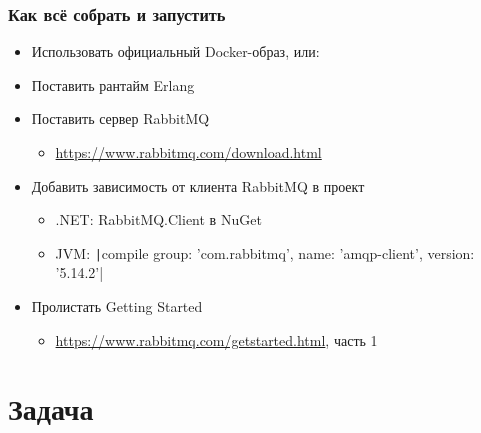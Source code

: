\documentclass{../../slides-style}
\begin{document}
    \begin{frame}
        \frametitle{Как всё собрать и запустить}
        \begin{itemize}
            \item Использовать официальный Docker-образ, или:
            \item Поставить рантайм Erlang
            \item Поставить сервер RabbitMQ
            \begin{itemize}
                \item \url{https://www.rabbitmq.com/download.html}
            \end{itemize}
            \item Добавить зависимость от клиента RabbitMQ в проект
            \begin{itemize}
                \item .NET: RabbitMQ.Client в NuGet
                \item JVM: \texttt|compile group: 'com.rabbitmq', name: 'amqp-client', version: '5.14.2'|
            \end{itemize}
            \item Пролистать Getting Started 
            \begin{itemize}
                \item \url{https://www.rabbitmq.com/getstarted.html}, часть 1
            \end{itemize}
        \end{itemize}
    \end{frame}

    \section{Задача}
\end{document}
